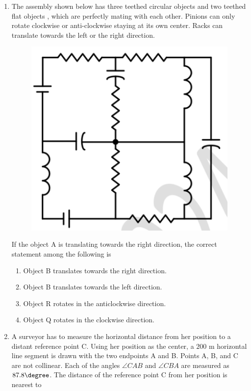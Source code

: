 \documentclass[journal,12pt,onecolumn]{IEEEtran}
\theoremstyle{remark}
\begin{document}
\begin{enumerate}[start=1, label=Q.\arabic*]
    \hfill{}
\item The assembly shown below has three teethed circular objects  and two teethed flat objects , which are perfectly mating with each other. Pinions can only rotate clockwise or anti-clockwise staying at its own center. Racks can translate towards the left \brak{\leftarrow} or the right \brak{\rightarrow} direction.
    \begin{figure}[H]
        \centering
        \includegraphics[width=0.5\columnwidth]{Figures/q12.png}
        \caption*{}
    \end{figure}
    If the object A  is translating towards the right \brak{\rightarrow} direction, the correct statement among the following is

    \begin{enumerate}
        \item Object B translates towards the right direction.
        \item Object B translates towards the left direction.
        \item Object R rotates in the anticlockwise direction.
        \item Object Q rotates in the clockwise direction.
    \end{enumerate}

    \hfill{}

    \item A surveyor has to measure the horizontal distance from her position to a distant reference point C. Using her position as the center, a $200$ m horizontal line segment is drawn with the two endpoints A and B. Points A, B, and C are not collinear. Each of the angles $\angle CAB$ and $\angle CBA$ are measured as $87.8\degree$. The distance  of the reference point C from her position is nearest to
    \begin{enumerate}
    \end{enumerate}


\end{enumerate}
\end{document}
